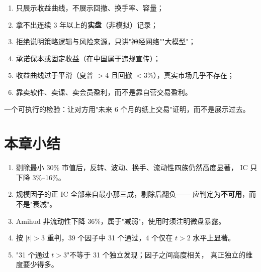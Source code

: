 \begin{warnbox}[识别"AI 炒股"产品的六个红旗]
\begin{enumerate}
  \item 只展示收益曲线，不展示回撤、换手率、容量；
  \item 拿不出连续 3 年以上的\textbf{实盘}（非模拟）记录；
  \item 拒绝说明策略逻辑与风险来源，只讲"神经网络""大模型"；
  \item 承诺保本或固定收益（在中国属于违规宣传）；
  \item 收益曲线过于平滑（夏普 $>4$ 且回撤 $<3\%$），真实市场几乎不存在；
  \item 靠卖软件、卖课、卖会员盈利，而不是靠自营交易盈利。
\end{enumerate}

一个可执行的检验：让对方用"未来 6 个月的纸上交易"证明，而不是展示过去。
\end{warnbox}

\section{本章小结}

\begin{enumerate}
  \item 剔除最小 30\% 市值后，反转、波动、换手、流动性四族仍然高度显著，
        IC 只下降 3\%--16\%。
  \item 规模因子的正 IC 全部来自最小那三成，剔除后翻负——
        应判定为\textbf{不可用}，而不是"衰减"。
  \item Amihud 非流动性下降 36\%，属于"减弱"，使用时须注明微盘暴露。
  \item 按 $|t|>3$ 重判，39 个因子中 31 个通过，4 个仅在 $t>2$ 水平上显著。
  \item "31 个通过 $t>3$"不等于 31 个独立发现；因子之间高度相关，
        真正独立的维度要少得多。
\end{enumerate}
